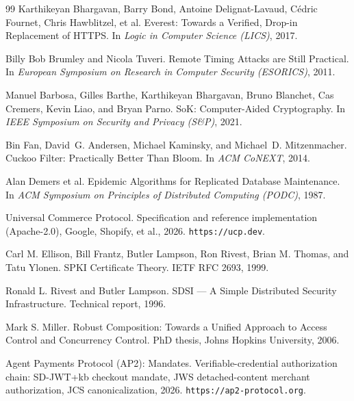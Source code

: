 \documentclass[11pt,a4paper]{article}
\theoremstyle{definition}
\begin{document}
\begin{thebibliography}{99}
Karthikeyan Bhargavan, Barry Bond, Antoine Delignat-Lavaud, Cédric Fournet, Chris Hawblitzel, et al.
\newblock Everest: Towards a Verified, Drop-in Replacement of HTTPS.
\newblock In \textit{Logic in Computer Science (LICS)}, 2017.

Billy Bob Brumley and Nicola Tuveri.
\newblock Remote Timing Attacks are Still Practical.
\newblock In \textit{European Symposium on Research in Computer Security (ESORICS)}, 2011.

Manuel Barbosa, Gilles Barthe, Karthikeyan Bhargavan, Bruno Blanchet, Cas Cremers, Kevin Liao, and Bryan Parno.
\newblock SoK: Computer-Aided Cryptography.
\newblock In \textit{IEEE Symposium on Security and Privacy (S\&P)}, 2021.

Bin Fan, David~G. Andersen, Michael Kaminsky, and Michael~D. Mitzenmacher.
\newblock Cuckoo Filter: Practically Better Than Bloom.
\newblock In \textit{ACM CoNEXT}, 2014.

Alan Demers et al.
\newblock Epidemic Algorithms for Replicated Database Maintenance.
\newblock In \textit{ACM Symposium on Principles of Distributed Computing (PODC)}, 1987.

Universal Commerce Protocol.
\newblock Specification and reference implementation (Apache-2.0), Google, Shopify, et al., 2026.
\newblock \texttt{https://ucp.dev}.

Carl M. Ellison, Bill Frantz, Butler Lampson, Ron Rivest, Brian M. Thomas, and Tatu Ylonen.
\newblock SPKI Certificate Theory.
\newblock IETF RFC 2693, 1999.

Ronald L. Rivest and Butler Lampson.
\newblock SDSI --- A Simple Distributed Security Infrastructure.
\newblock Technical report, 1996.

Mark S. Miller.
\newblock Robust Composition: Towards a Unified Approach to Access Control and Concurrency Control.
\newblock PhD thesis, Johns Hopkins University, 2006.

Agent Payments Protocol (AP2): Mandates.
\newblock Verifiable-credential authorization chain: SD-JWT+kb checkout mandate, JWS detached-content merchant authorization, JCS canonicalization, 2026.
\newblock \texttt{https://ap2-protocol.org}.

\end{thebibliography}
\end{document}
